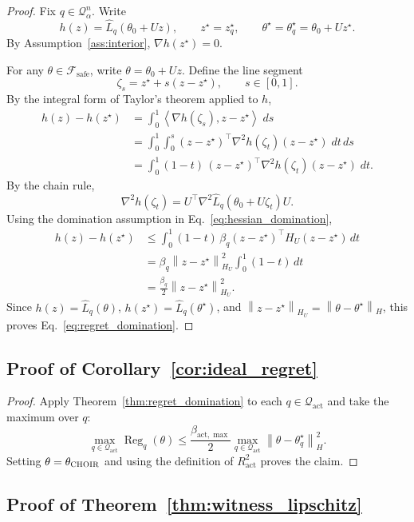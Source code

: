 \documentclass{article}
\newcommand{\cF}{\mathcal{F}}
\newcommand{\cQ}{\mathcal{Q}}
\newcommand{\Reg}{\operatorname{Reg}}
\newcommand{\choir}{\textup{\textsc{CHOIR}}}
\newcommand{\norm}[1]{\left\lVert #1 \right\rVert}
\newcommand{\inner}[2]{\left\langle #1, #2 \right\rangle}
\newcommand{\safe}{\mathrm{safe}}
\newcommand{\act}{\mathrm{act}}
\begin{document}
\begin{proof}
Fix \(q\in\cQ_\alpha^n\). Write
\[
h(z)=\widehat L_q(\theta_0+Uz),
\qquad
z^\star=z_q^\star,
\qquad
\theta^\star=\theta_q^\star=\theta_0+Uz^\star.
\]
By Assumption~\ref{ass:interior}, \(\nabla h(z^\star)=0\).

For any \(\theta\in\cF_{\safe}\), write \(\theta=\theta_0+Uz\). Define the line segment
\[
\zeta_s = z^\star + s(z-z^\star),
\qquad s\in[0,1].
\]
By the integral form of Taylor's theorem applied to \(h\),
\begin{align*}
h(z)-h(z^\star)
&=
\int_{0}^{1}
\inner{\nabla h(\zeta_s)}{z-z^\star}
\; ds \\
&=
\int_{0}^{1}
\int_{0}^{s}
(z-z^\star)^\top
\nabla^2 h(\zeta_t)
(z-z^\star)
\; dt \, ds \\
&=
\int_{0}^{1}
(1-t)\,
(z-z^\star)^\top
\nabla^2 h(\zeta_t)
(z-z^\star)
\; dt.
\end{align*}
By the chain rule,
\[
\nabla^2 h(\zeta_t)
=
U^\top \nabla^2 \widehat L_q(\theta_0+U\zeta_t) U.
\]
Using the domination assumption in Eq.~\eqref{eq:hessian_domination},
\begin{align*}
h(z)-h(z^\star)
&\le
\int_0^1 (1-t)\,
\beta_q
(z-z^\star)^\top H_U (z-z^\star)\, dt \\
&=
\beta_q
\norm{z-z^\star}_{H_U}^2
\int_0^1 (1-t)\, dt \\
&=
\frac{\beta_q}{2}\norm{z-z^\star}_{H_U}^2.
\end{align*}
Since \(h(z)=\widehat L_q(\theta)\), \(h(z^\star)=\widehat L_q(\theta^\star)\), and \(\norm{z-z^\star}_{H_U}=\norm{\theta-\theta^\star}_H\), this proves Eq.~\eqref{eq:regret_domination}.
\end{proof}

\subsection{Proof of Corollary~\ref{cor:ideal_regret}}

\begin{proof}
Apply Theorem~\ref{thm:regret_domination} to each \(q\in\cQ_{\act}\) and take the maximum over \(q\):
\[
\max_{q\in\cQ_{\act}} \Reg_q(\theta)
\le
\frac{\beta_{\act,\max}}{2}
\max_{q\in\cQ_{\act}}\norm{\theta-\theta_q^\star}_H^2.
\]
Setting \(\theta=\theta_{\choir}\) and using the definition of \(R_\act^2\) proves the claim.
\end{proof}

\subsection{Proof of Theorem~\ref{thm:witness_lipschitz}}
\end{document}
